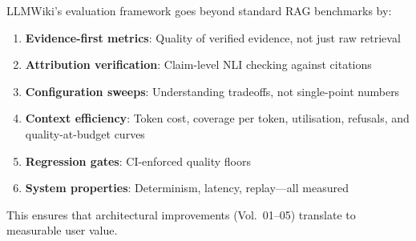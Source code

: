 LLMWiki's evaluation framework goes beyond standard RAG benchmarks by:
\begin{enumerate}
  \item \textbf{Evidence-first metrics}: Quality of verified evidence, not just raw retrieval
  \item \textbf{Attribution verification}: Claim-level NLI checking against citations
  \item \textbf{Configuration sweeps}: Understanding tradeoffs, not single-point numbers
  \item \textbf{Context efficiency}: Token cost, coverage per token, utilisation, refusals, and quality-at-budget curves
  \item \textbf{Regression gates}: CI-enforced quality floors
  \item \textbf{System properties}: Determinism, latency, replay---all measured
\end{enumerate}
This ensures that architectural improvements (Vol.~01--05) translate to measurable user value.

